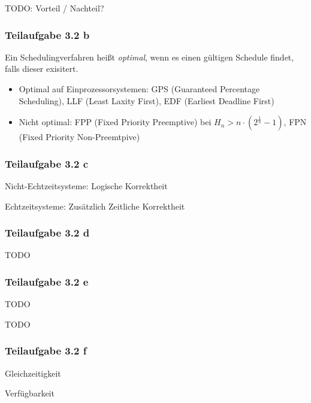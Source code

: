 \documentclass[a4paper]{scrartcl}
\begin{document}
  TODO: Vorteil / Nachteil?


  \subsubsection*{Teilaufgabe 3.2 b}
  Ein Schedulingverfahren heißt \textit{optimal}, wenn es einen gültigen
  Schedule findet, falls dieser exisitert.

  \begin{itemize}
      \item Optimal auf Einprozessorsystemen: GPS (Guaranteed Percentage Scheduling),
            LLF (Least Laxity First),
            EDF (Earliest Deadline First)
      \item Nicht optimal: FPP (Fixed Priority Preemptive) bei $H_n > n \cdot (2^{\frac{1}{n}} - 1)$,
            FPN (Fixed Priority Non-Preemtpive)
  \end{itemize}


  \subsubsection*{Teilaufgabe 3.2 c}
  Nicht-Echtzeitsysteme: Logische Korrektheit

  Echtzeitsysteme: Zusätzlich Zeitliche Korrektheit


  \subsubsection*{Teilaufgabe 3.2 d}
  TODO

  \subsubsection*{Teilaufgabe 3.2 e}
  \begin{enumerate*}[label=(\arabic*)]
      \item TODO
      \item TODO
  \end{enumerate*}

  \subsubsection*{Teilaufgabe 3.2 f}
  \begin{enumerate*}[label=(\arabic*)]
      \item Gleichzeitigkeit
      \item Verfügbarkeit
  \end{enumerate*}
\end{document}
